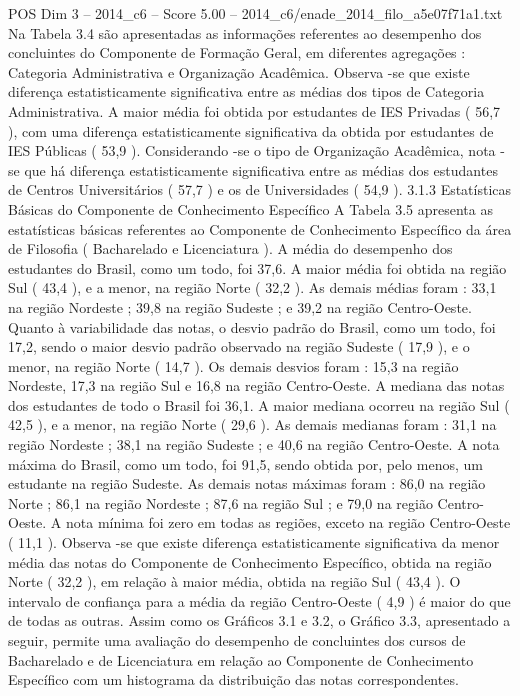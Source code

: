 \begin{textsample}{POS Dim 3 – 2014\_c6 – Score 5.00 – 2014\_c6/enade\_2014\_filo\_a5e07f71a1.txt}
Na Tabela 3.4 são apresentadas as informações referentes ao desempenho dos concluintes do Componente de Formação Geral, em diferentes agregações : Categoria Administrativa e Organização Acadêmica.
Observa -se que existe diferença estatisticamente significativa entre as médias dos tipos de Categoria Administrativa.
A maior média foi obtida por estudantes de IES Privadas ( 56,7 ), com uma diferença estatisticamente significativa da obtida por estudantes de IES Públicas ( 53,9 ).
Considerando -se o tipo de Organização Acadêmica, nota -se que há diferença estatisticamente significativa entre as médias dos estudantes de Centros Universitários ( 57,7 ) e os de Universidades ( 54,9 ). 3.1.3 Estatísticas Básicas do Componente de Conhecimento Específico A Tabela 3.5 apresenta as estatísticas básicas referentes ao Componente de Conhecimento Específico da área de Filosofia ( Bacharelado e Licenciatura ).
A média do desempenho dos estudantes do Brasil, como um todo, foi 37,6.
A maior média foi obtida na região Sul ( 43,4 ), e a menor, na região Norte ( 32,2 ).
As demais médias foram : 33,1 na região Nordeste ; 39,8 na região Sudeste ; e 39,2 na região Centro-Oeste.
Quanto à variabilidade das notas, o desvio padrão do Brasil, como um todo, foi 17,2, sendo o maior desvio padrão observado na região Sudeste ( 17,9 ), e o menor, na região Norte ( 14,7 ).
Os demais desvios foram : 15,3 na região Nordeste, 17,3 na região Sul e 16,8 na região Centro-Oeste.
A mediana das notas dos estudantes de todo o Brasil foi 36,1.
A maior mediana ocorreu na região Sul ( 42,5 ), e a menor, na região Norte ( 29,6 ).
As demais medianas foram : 31,1 na região Nordeste ; 38,1 na região Sudeste ; e 40,6 na região Centro-Oeste.
A nota máxima do Brasil, como um todo, foi 91,5, sendo obtida por, pelo menos, um estudante na região Sudeste.
As demais notas máximas foram : 86,0 na região Norte ; 86,1 na região Nordeste ; 87,6 na região Sul ; e 79,0 na região Centro-Oeste.
A nota mínima foi zero em todas as regiões, exceto na região Centro-Oeste ( 11,1 ).
Observa -se que existe diferença estatisticamente significativa da menor média das notas do Componente de Conhecimento Específico, obtida na região Norte ( 32,2 ), em relação à maior média, obtida na região Sul ( 43,4 ).
O intervalo de confiança para a média da região Centro-Oeste ( 4,9 ) é maior do que de todas as outras.
Assim como os Gráficos 3.1 e 3.2, o Gráfico 3.3, apresentado a seguir, permite uma avaliação do desempenho de concluintes dos cursos de Bacharelado e de Licenciatura em relação ao Componente de Conhecimento Específico com um histograma da distribuição das notas correspondentes.

\end{textsample}
